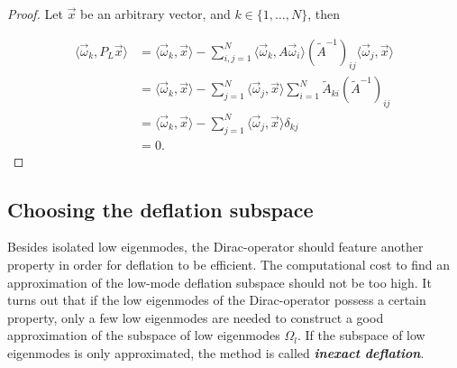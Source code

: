 \documentclass{article}
\theoremstyle{plain} %
\theoremstyle{convention} %
\theoremstyle{remark} %
\def\df#1{\textbf{\textit{#1}}}
\numberwithin{equation}{section}
\begin{document}
\begin{proof}

Let $\vec{x}$ be an arbitrary vector, and $k \in \{1, \dots, N\}$, then

\begin{align*}
    \langle \vec{\omega}_k, P_L \vec{x} \rangle &= \langle \vec{\omega}_k, \vec{x} \rangle - \sum_{i,j=1}^N \langle \vec{\omega}_k, A \vec{\omega}_i \rangle (\widetilde{A}^{-1})_{ij} \langle \vec{\omega}_j, \vec{x} \rangle \\
    &= \langle \vec{\omega}_k, \vec{x} \rangle - \sum_{j=1}^N \langle \vec{\omega}_j, \vec{x} \rangle \sum_{i=1}^N \widetilde{A}_{ki} (\widetilde{A}^{-1})_{ij} \\
    &= \langle \vec{\omega}_k, \vec{x} \rangle - \sum_{j=1}^N \langle \vec{\omega}_j, \vec{x} \rangle \delta_{kj} \\
    &= 0.
\end{align*}

\end{proof}

\subsection{Choosing the deflation subspace}

\label{sec:dfl_subspace}

Besides isolated low eigenmodes, the Dirac-operator should feature another property in order for deflation to be efficient. The computational cost to find an approximation of the low-mode deflation subspace should not be too high. It turns out that if the low eigenmodes of the Dirac-operator possess a certain property, only a few low eigenmodes are needed to construct a good approximation of the subspace of low eigenmodes $\Omega_l$. If the subspace of low eigenmodes is only approximated, the method is called \df{inexact deflation}.
\end{document}
